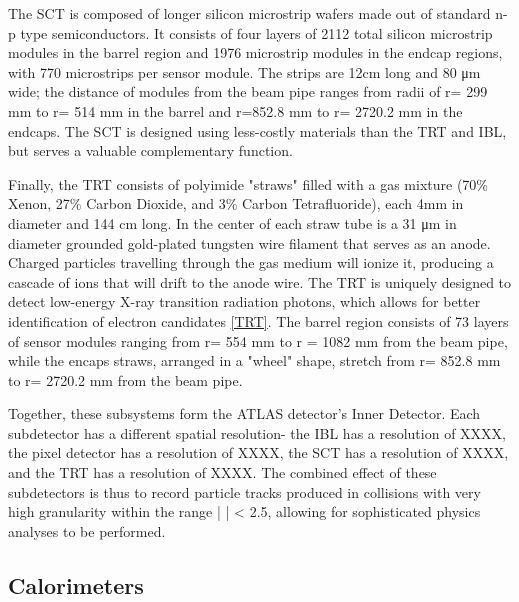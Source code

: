 The SCT is composed of longer silicon microstrip wafers made out of standard n-p type semiconductors. It consists of four layers of 2112 total silicon microstrip modules in the barrel region and 1976 microstrip modules in the endcap regions, with 770 microstrips per sensor module. The strips are 12cm long and 80 μm wide; the distance of modules from the beam pipe ranges from radii of r= 299 mm to r= 514 mm in the barrel and r=852.8 mm to r= 2720.2 mm in the endcaps. The SCT is designed using less-costly materials than the TRT and IBL, but serves a valuable complementary function.

Finally, the TRT consists of polyimide "straws" filled with a gas mixture (70\% Xenon, 27\% Carbon Dioxide, and 3\% Carbon Tetrafluoride), each 4mm in diameter and 144 cm long. In the center of each straw tube is a 31 μm in diameter grounded gold-plated tungsten wire filament that serves as an anode. Charged particles travelling through the gas medium will ionize it, producing a cascade of ions that will drift to the anode wire. The TRT is uniquely designed to detect low-energy X-ray transition radiation photons, which allows for better identification of electron candidates \ref{TRT}. The barrel region consists of 73 layers of sensor modules ranging from r= 554 mm to r = 1082 mm from the beam pipe, while the encaps straws, arranged in a "wheel" shape, stretch from r= 852.8 mm to r= 2720.2 mm from the beam pipe. 

Together, these subsystems form the ATLAS detector's Inner Detector. Each subdetector has a different spatial resolution- the IBL has a resolution of XXXX, the pixel detector has a resolution of XXXX, the SCT has a resolution of XXXX, and the TRT has a resolution of XXXX. The combined effect of these subdetectors is thus to record particle tracks produced in collisions with very high granularity within the range | \eta | < 2.5, allowing for sophisticated physics analyses to be performed. 

\subsection{Calorimeters} \label{sec:Calos} 


